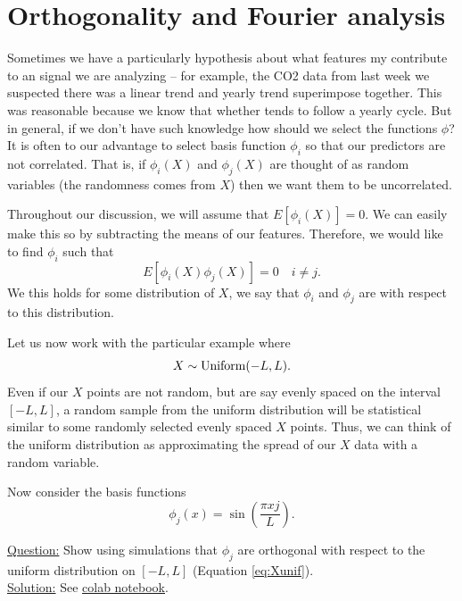 \section{Orthogonality and Fourier analysis}
 Sometimes we have a particularly hypothesis about what features my contribute to an signal we are analyzing -- for example, the CO2 data from last week we suspected there was a linear trend and yearly trend superimpose together. This was reasonable because we know that whether tends to follow a yearly cycle. But in general, if we don't have such knowledge how should we select the functions $\phi$?  It is often to our advantage to select basis function $\phi_i$ so that our predictors are not correlated. That is, if $\phi_i(X)$ and $\phi_j(X)$ are thought of as random variables (the randomness comes from $X$) then we want them to be uncorrelated. 


Throughout our discussion, we will assume that $E[\phi_i(X)]=0$. We can easily make this so by subtracting the means of our features. Therefore, we would like to find $\phi_i$ such that 
\begin{equation}\label{eq:orth}
E[\phi_i(X)\phi_j(X)] = 0 \quad i\ne j.
\end{equation}
We this holds for some distribution of $X$, we say that $\phi_i$ and $\phi_j$ are  with respect to this distribution.



\begin{example}\label{ex:sin}

Let us now work with the particular example where 
\begin{equation}\label{eq:Xunif}
X \sim {\rm Uniform}(-L,L).
\end{equation}
Even if our $X$ points are not random, but are say evenly spaced on the interval $[-L,L]$, a random sample from the uniform distribution will be statistical similar to some randomly selected evenly spaced $X$ points. Thus, we can think of the uniform distribution as approximating the spread of our $X$ data with a random variable. 

Now consider the basis functions 
\begin{equation*}
\phi_j(x) = \sin\left(\frac{\pi x j}{L} \right).
\end{equation*}

 


\noindent
\underline{Question:} Show using simulations that $\phi_j$ are orthogonal with respect to the uniform distribution on $[-L,L]$ (Equation \ref{eq:Xunif}). \\


\noindent
\underline{Solution:}  See \href{https://colab.research.google.com/drive/1EYcMviowfsnsVe7vsUKlyzkNsddUiTau?usp=sharing}{colab notebook}.

\end{example}


